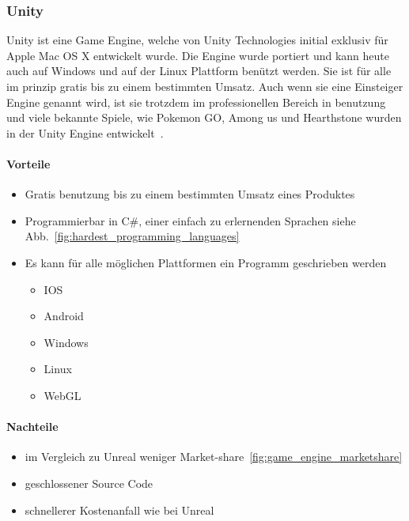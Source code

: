 \subsubsection{Unity}

Unity ist eine Game Engine, welche von Unity Technologies initial exklusiv für Apple Mac OS X entwickelt wurde.
Die Engine wurde portiert und kann heute auch auf Windows und auf der Linux Plattform benützt werden.
Sie ist für alle im prinzip gratis bis zu einem bestimmten Umsatz.
Auch wenn sie eine Einsteiger Engine genannt wird, ist sie trotzdem im professionellen Bereich in benutzung und viele bekannte Spiele, wie Pokemon GO, Among us und Hearthstone wurden in der Unity Engine entwickelt~\cite{Haas2014AHO,UNITY_DOWNLOAD,UNITY_PRICING,WIKIPEDIA_UNITY_GAME_LIST_2014}.

\paragraph{Vorteile}

\begin{itemize}
    \item Gratis benutzung bis zu einem bestimmten Umsatz eines Produktes
    \item Programmierbar in C\#, einer einfach zu erlernenden Sprachen siehe Abb.~\ref{fig:hardest_programming_languages}
    \item Es kann für alle möglichen Plattformen ein Programm geschrieben werden~\cite{UNITY_PLATTFORMS}
    \begin{itemize}
        \item IOS
        \item Android
        \item Windows
        \item Linux
        \item WebGL
    \end{itemize}
\end{itemize}

\paragraph{Nachteile}

\begin{itemize}
    \item im Vergleich zu Unreal weniger Market-share~\ref{fig:game_engine_marketshare}
    \item geschlossener Source Code
    \item schnellerer Kostenanfall wie bei Unreal
\end{itemize}


